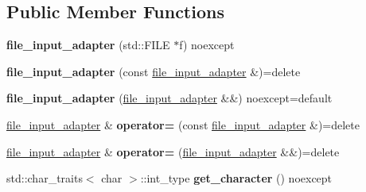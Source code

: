 \subsection*{Public Member Functions}
\begin{DoxyCompactItemize}
\item 
\mbox{\label{classnlohmann_1_1detail_1_1file__input__adapter_aeade050f2793280503be93feff2ece5b}} 
{\bfseries file\+\_\+input\+\_\+adapter} (std\+::\+F\+I\+LE $\ast$f) noexcept
\item 
\mbox{\label{classnlohmann_1_1detail_1_1file__input__adapter_a308099b496a0cba2123a06fe99a95d02}} 
{\bfseries file\+\_\+input\+\_\+adapter} (const \hyperlink{classnlohmann_1_1detail_1_1file__input__adapter}{file\+\_\+input\+\_\+adapter} \&)=delete
\item 
\mbox{\label{classnlohmann_1_1detail_1_1file__input__adapter_a5a35c5bc8d6216ee6e4070fc4b6b0127}} 
{\bfseries file\+\_\+input\+\_\+adapter} (\hyperlink{classnlohmann_1_1detail_1_1file__input__adapter}{file\+\_\+input\+\_\+adapter} \&\&) noexcept=default
\item 
\mbox{\label{classnlohmann_1_1detail_1_1file__input__adapter_ad59bbc7e3f23dd74475c5cb818784e42}} 
\hyperlink{classnlohmann_1_1detail_1_1file__input__adapter}{file\+\_\+input\+\_\+adapter} \& {\bfseries operator=} (const \hyperlink{classnlohmann_1_1detail_1_1file__input__adapter}{file\+\_\+input\+\_\+adapter} \&)=delete
\item 
\mbox{\label{classnlohmann_1_1detail_1_1file__input__adapter_acfd616c651d601a1dfc7fbdd6973f716}} 
\hyperlink{classnlohmann_1_1detail_1_1file__input__adapter}{file\+\_\+input\+\_\+adapter} \& {\bfseries operator=} (\hyperlink{classnlohmann_1_1detail_1_1file__input__adapter}{file\+\_\+input\+\_\+adapter} \&\&)=delete
\item 
\mbox{\label{classnlohmann_1_1detail_1_1file__input__adapter_a300fa4e2da1891e97eb0d85bf14cb022}} 
std\+::char\+\_\+traits$<$ char $>$\+::int\+\_\+type {\bfseries get\+\_\+character} () noexcept
\end{DoxyCompactItemize}


